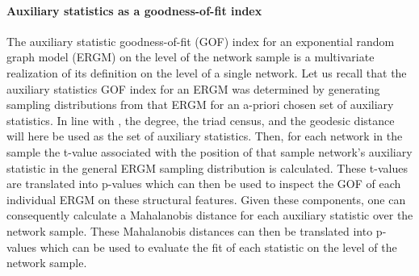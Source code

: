 \documentclass[a4paper, man, floatsintext]{apa6}
\begin{document}
\paragraph{Auxiliary statistics as a goodness-of-fit index} The auxiliary statistic goodness-of-fit (GOF) index for an exponential random graph model (ERGM) on the level of the network sample is a multivariate realization of its definition on the level of a single network. Let us recall that the auxiliary statistics GOF index for an ERGM was determined by generating sampling distributions from that ERGM for an a-priori chosen set of auxiliary statistics. In line with , the degree, the triad census, and the geodesic distance will here be used as the set of auxiliary statistics. Then, for each network in the sample the t-value associated with the position of that sample network's auxiliary statistic in the general ERGM sampling distribution is calculated. These t-values are translated into p-values which can then be used to inspect the GOF of each individual ERGM on these structural features. Given these components, one can consequently calculate a Mahalanobis distance for each auxiliary statistic over the network sample. These Mahalanobis distances can then be translated into p-values which can be used to evaluate the fit of each statistic on the level of the network sample. 
\\
\end{document}
